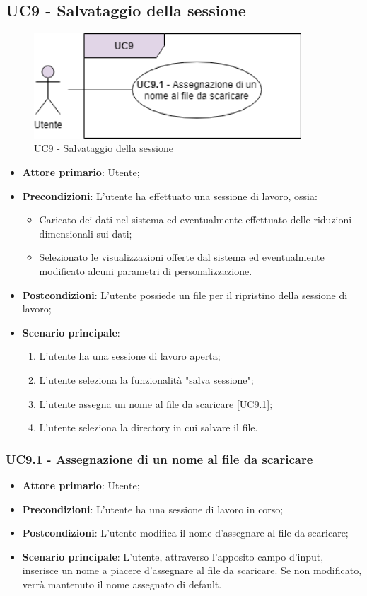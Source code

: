 \subsection{UC9 - Salvataggio della sessione}
\begin{figure}[h]
\includegraphics[width=10cm]{Section/Images/UC9.png}
\centering
\caption{UC9 - Salvataggio della sessione}
\end{figure}
\begin{itemize}
	\item \textbf{Attore primario}: Utente;
	\item \textbf{Precondizioni}: L'utente ha effettuato una sessione di lavoro, ossia:
	\begin{itemize}
	\item Caricato dei dati nel sistema ed eventualmente effettuato delle riduzioni dimensionali sui dati;
	\item Selezionato le visualizzazioni offerte dal sistema ed eventualmente modificato alcuni parametri di personalizzazione.
\end{itemize}	 
	\item \textbf{Postcondizioni}: L'utente possiede un file  per il ripristino della sessione di lavoro;
	\item \textbf{Scenario principale}:
		\begin{enumerate}
			\item L'utente ha una sessione di lavoro aperta;
			\item L'utente seleziona la funzionalità "salva sessione";
			\item L'utente assegna un nome al file da scaricare [UC9.1];
			\item L'utente seleziona la directory in cui salvare il file.
		\end{enumerate}
\end{itemize}



\subsubsection{UC9.1 - Assegnazione di un nome al file da scaricare}

\begin{itemize}
	\item \textbf{Attore primario}: Utente;
	\item \textbf{Precondizioni}: L'utente ha una sessione di lavoro in corso; 
	\item \textbf{Postcondizioni}: L'utente modifica il nome d'assegnare al file da scaricare;
	\item \textbf{Scenario principale}: L'utente, attraverso l'apposito campo d'input, inserisce un nome a piacere d'assegnare al file da scaricare. Se non modificato, verrà mantenuto il nome assegnato di default.
\end{itemize}